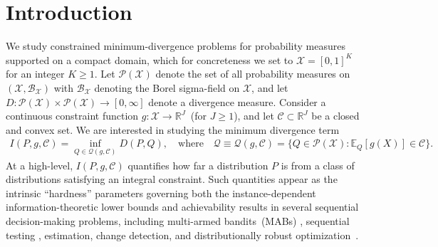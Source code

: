 \documentclass{article}
\theoremstyle{plain}
\theoremstyle{definition}
\newcommand{\R}{\mathbb{R}}
\newcommand{\calP}{\mathcal P}
\newcommand{\calC}{\mathcal C}
\newcommand{\calQ}{\mathcal Q}
\newcommand{\calX}{\mathcal X}
\newcommand{\calB}{\mathcal B}
\newcommand{\qtext}[1]{\quad \text{#1} \quad}
\begin{document}
\section{Introduction}
We study constrained minimum-divergence problems for probability measures supported on a compact domain, which for concreteness we set to $\calX = [0,1]^K$ for an integer $K \geq 1$.  Let $\calP(\calX)$ denote the set of all probability measures on $(\calX, \calB_{\calX})$ with $\calB_{\calX}$ denoting the Borel sigma-field on $\calX$, and let $D:\calP(\calX) \times \calP(\calX) \to [0, \infty]$ denote a divergence measure. Consider a continuous constraint function $g:\calX \to \R^J$~(for $J \geq 1$), and let $\calC \subset \R^J$ be a closed and convex set. We are interested in studying the minimum divergence term 
\begin{align}
    I(P, g, \calC) = \inf_{Q \in \calQ(g, \calC)} D(P, Q), \qtext{where} \calQ \equiv \calQ(g, \calC) = \{Q \in \calP(\calX): \mathbb{E}_Q[g(X)] \in \calC \}.  \label{eq:general-min-divergence}
\end{align}
At a high-level, $I(P, g, \calC)$ quantifies how far a distribution $P$ is from a class of distributions satisfying an integral constraint. Such quantities appear as the intrinsic ``hardness'' parameters governing both the instance-dependent information-theoretic lower bounds and achievability results in several sequential decision-making problems, including multi-armed bandits~(MABs) \citep{lai1985asymptotically,burnetas1996optimal}, sequential testing \citep{agrawal2025stopping}, estimation, change detection, and distributionally robust optimization~\citep{bayraksan2015data, hu2013kullback}. %
\end{document}

